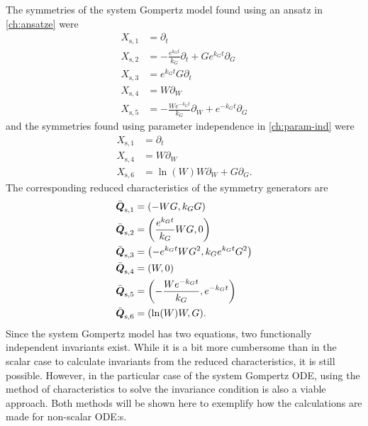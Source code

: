 The symmetries of the system Gompertz model found using an ansatz in \cref{ch:ansatze} were
\begin{align*}
  X_{\text{s},1} &= \partial_t \\
  X_{\text{s},2} &= - \frac{e^{k_{G} t}}{k_{G}} \partial_t + G e^{k_{G} t} \partial_G \\
  X_{\text{s},3} &= e^{k_{G} t} G \partial_t \\
  X_{\text{s},4} &= W \partial_W \\
  X_{\text{s},5} &= - \frac{W e^{- k_{G} t}}{k_{G}} \partial_W + e^{- k_{G} t} \partial_G
\end{align*}
and the symmetries found using parameter independence in \cref{ch:param-ind} were
\begin{align*}
  X_{\text{s},1} &= \partial_t \\
  X_{\text{s},4} &= W \partial_W \\
  X_{\text{s},6} &= \ln\left(W\right) W \partial_W + G \partial_G.
\end{align*}
The corresponding reduced characteristics of the symmetry generators are
\begin{align*}
  \bar{\vect{Q}}_{\text{s},1} &= \left(-W G, k_G G\right) \\
  \bar{\vect{Q}}_{\text{s},2} &= \left(\frac{e^{k_{G} t}}{k_{G}} W G, 0\right) \\
  \bar{\vect{Q}}_{\text{s},3} &= \left(- e^{k_{G} t} W G^2, k_G e^{k_{G} t} G^2\right) \\
  \bar{\vect{Q}}_{\text{s},4} &= \left(W, 0\right) \\
  \bar{\vect{Q}}_{\text{s},5} &= \left(- \frac{W e^{- k_{G} t}}{k_{G}}, e^{- k_{G} t} \right) \\
  \bar{\vect{Q}}_{\text{s},6} &= \left(\ln\left(W\right) W, G\right).
\end{align*}
Since the system Gompertz model has two equations, two functionally independent invariants exist.
While it is a bit more cumbersome than in the scalar case to calculate invariants from the reduced characteristics, it is still possible.
However, in the particular case of the system Gompertz ODE, using the method of characteristics to solve the invariance condition is also a viable approach.
Both methods will be shown here to exemplify how the calculations are made for non-scalar ODE:s.

